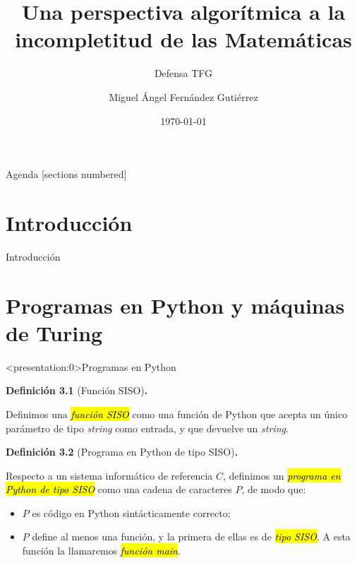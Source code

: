 \documentclass[10pt,xcolor=dvipsnames,aspectratio=169,spanish]{beamer}
\title{Una perspectiva algorítmica a la incompletitud de las Matemáticas}
\subtitle{Defensa TFG}
\date{\today}
\author{Miguel Ángel Fernández Gutiérrez}
\makeatletter
\let\HL\hl
\renewcommand\hl{%
  \let\set@color\beamerorig@set@color
  \let\reset@color\beamerorig@reset@color
  \HL}
\newcommand{\hle}[1]{\hl{\emph{#1}}}
\makeatother
\begin{document}
\maketitle

\begin{frame}{Agenda}
  [sections numbered]
  \tableofcontents%
\end{frame}

\section[Introducción]{Introducción}

\begin{frame}[fragile]{Introducción}
\begin{adjustbox}{max height={.75\textheight},center}

\end{adjustbox}

\end{frame}

\section[Programas en Python y\\máquinas de Turing]{Programas en Python y máquinas de Turing}

\begin{frame}<presentation:0>{Programas en Python}

\textbf{Definición 3.1} (Función SISO)\textbf{.}

Definimos una \hle{función SISO} como una función de Python que acepta un único parámetro de tipo \emph{string} como entrada, y que devuelve un \emph{string}.

\vspace{5mm}

\textbf{Definición 3.2} (Programa en Python de tipo SISO)\textbf{.}

Respecto a un sistema informático de referencia $C$, definimos un \hle{programa en Python de tipo SISO} como una cadena de caracteres $P$, de modo que:

\begin{itemize}
    \item $P$ es código en Python sintácticamente correcto;
    \item $P$ define al menos una función, y la primera de ellas es de \hle{tipo SISO}. A esta función la llamaremos \hle{función main}.
\end{itemize}

\end{frame}
\end{document}

